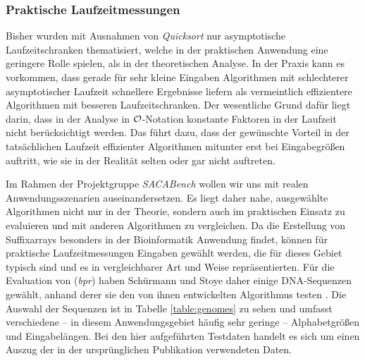 \subsubsection{Praktische Laufzeitmessungen}
\label{bpr:effizienz:praxis}

Bisher wurden mit Ausnahmen von \emph{Quicksort} nur asymptotische Laufzeitschranken thematisiert, welche in der praktischen Anwendung eine geringere Rolle spielen, als in der theoretischen Analyse.
In der Praxis kann es vorkommen, dass gerade für sehr kleine Eingaben Algorithmen mit schlechterer asymptotischer Laufzeit schnellere Ergebnisse liefern als vermeintlich effizientere Algorithmen mit besseren Laufzeitschranken.
Der wesentliche Grund dafür liegt darin, dass in der Analyse in \(\mathcal{O}\)-Notation konstante Faktoren in der Laufzeit nicht berücksichtigt werden. Das führt dazu, dass der gewünschte Vorteil in der tatsächlichen Laufzeit effizienter Algorithmen mitunter erst bei Eingabegrößen auftritt, wie sie in der Realität selten oder gar nicht auftreten.\par\smallskip
Im Rahmen der Projektgruppe \emph{SACABench} wollen wir uns mit realen Anwendungsszenarien auseinandersetzen. Es liegt daher nahe, ausgewählte Algorithmen nicht nur in der Theorie, sondern auch im praktischen Einsatz zu evaluieren und mit anderen Algorithmen zu vergleichen. Da die Erstellung von Suffixarrays besonders in der Bioinformatik Anwendung findet, können für praktische Laufzeitmessungen Eingaben gewählt werden, die für dieses Gebiet typisch sind und es in vergleichbarer Art und Weise repräsentierten. Für die Evaluation von \bpr (\emph{bpr}) haben Schürmann und Stoye daher einige DNA-Sequenzen gewählt, anhand derer sie den von ihnen entwickelten Algorithmus testen \cite[Kapitel~4]{schuermann2005}. Die Auswahl der Sequenzen ist in Tabelle \ref{table:genomes} zu sehen und umfasst verschiedene -- in diesem Anwendungsgebiet häufig sehr geringe -- Alphabetgrößen und Eingabelängen. Bei den hier aufgeführten Testdaten handelt es sich um einen Auszug der in der ursprünglichen Publikation verwendeten Daten.\par
